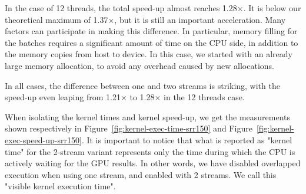 In the case of 12 threads, the total speed-up almost reaches 1.28$\times$. It is below our theoretical maximum of 1.37$\times$, but it is still an important acceleration. Many factors can participate in making this difference. In particular, memory filling for the batches requires a significant amount of time on the CPU side, in addition to the memory copies from host to device. In this case, we started with an already large memory allocation, to avoid any overhead caused by new allocations.

In all cases, the difference between one and two streams is striking, with the speed-up even leaping from 1.21$\times$ to 1.28$\times$ in the 12 threads case.

When isolating the kernel times and kernel speed-up, we get the measurements shown respectively in Figure~\ref{fig:kernel-exec-time-srr150} and Figure~\ref{fig:kernel-exec-speed-up-srr150}. It is important to notice that what is reported as "kernel time" for the 2-stream variant represents only the time during which the CPU is actively waiting for the GPU results. In other words, we have disabled overlapped execution when using one stream, and enabled with 2 streams. We call this "visible kernel execution time".


